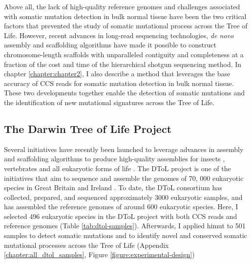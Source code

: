 Above all, the lack of high-quality reference genomes and challenges associated with somatic mutation detection in bulk normal tissue have been the two critical factors that prevented the study of somatic mutational process across the Tree of Life. However, recent advances in long-read sequencing technologies, \textit{de novo} assembly and scaffolding algorithms have made it possible to construct chromosome-length scaffolds with unparalleled contiguity and completeness at a fraction of the cost and time of the hierarchical shotgun sequencing method. In chapter \ref{chapter:chapter2}, I also describe a method that leverages the base accuracy of CCS reads for somatic mutation detection in bulk normal tissue. These two developments together enable the detection of somatic mutations and the identification of new mutational signatures across the Tree of Life.  


\subsection{The Darwin Tree of Life Project}

Several initiatives have recently been launched to leverage advances in assembly and scaffolding algorithms to produce high-quality assemblies for insects \cite{Childers2021-mq}, vertebrates \cite{Rhie2021-dq} and all eukaryotic forms of life \cite{Lawniczak2022-fm}.  The DToL project is one of the initiatives that aim to sequence and assemble the genomes of 70, 000 eukaryotic species in Great Britain and Ireland \cite{Darwin_Tree_of_Life_Project_Consortium2022-ma}. To date, the DToL consortium has collected, prepared, and sequenced approximately 3000 eukaryotic samples, and has assembled the reference genomes of around 600 eukaryotic species. Here, I selected 496 eukaryotic species in the DToL project with both CCS reads and reference genomes (Table \ref{tab:dtol-samples}). Afterwards, I applied himut to 501 samples to detect somatic mutations and to identify novel and conserved somatic mutational processes across the Tree of Life (Appendix \ref{chapter:all_dtol_samples}, Figure \ref{figure:experimental-design})

